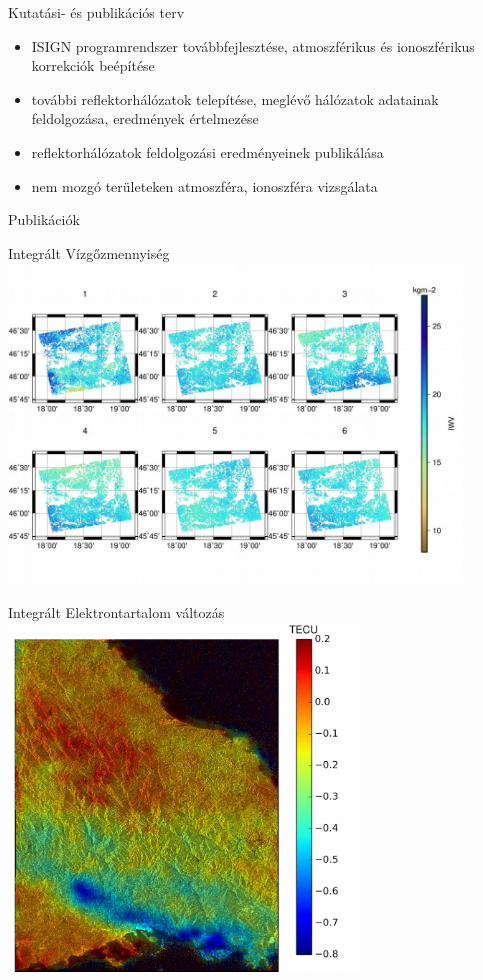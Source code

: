 \documentclass{beamer}
\begin{document}
\begin{frame}{Kutatási- és publikációs terv}

\begin{itemize}
    \item ISIGN programrendszer továbbfejlesztése, atmoszférikus
    és ionoszférikus korrekciók beépítése
    \item további reflektorhálózatok telepítése, meglévő hálózatok adatainak
    feldolgozása, eredmények értelmezése
    \item reflektorhálózatok feldolgozási eredményeinek publikálása
    \item nem mozgó területeken atmoszféra, ionoszféra vizsgálata
\end{itemize}

\end{frame}


\begin{frame}{Publikációk}
    
    
\end{frame}


\begin{frame}{Integrált Vízgőzmennyiség}
\includegraphics[width=0.9\textwidth]{iwv.png}
\end{frame}


\begin{frame}{Integrált Elektrontartalom változás}
\includegraphics[width=0.7\textwidth]{iono.png}
\end{frame}

\begin{frame}{}
\cite{Szucs2018, banyai2018mHuholdradar}
\end{frame}
\end{document}
